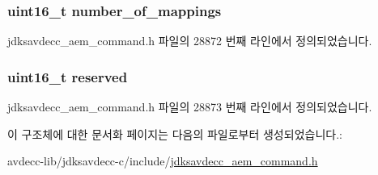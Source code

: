 \subsubsection[{\texorpdfstring{number\+\_\+of\+\_\+mappings}{number_of_mappings}}]{\setlength{\rightskip}{0pt plus 5cm}uint16\+\_\+t number\+\_\+of\+\_\+mappings}\hypertarget{structjdksavdecc__aem__command__remove__audio__mappings_ac7db472c5622ef473d5d0a5c416d5531}{}\label{structjdksavdecc__aem__command__remove__audio__mappings_ac7db472c5622ef473d5d0a5c416d5531}


jdksavdecc\+\_\+aem\+\_\+command.\+h 파일의 28872 번째 라인에서 정의되었습니다.

\subsubsection[{\texorpdfstring{reserved}{reserved}}]{\setlength{\rightskip}{0pt plus 5cm}uint16\+\_\+t reserved}\hypertarget{structjdksavdecc__aem__command__remove__audio__mappings_a5a6ed8c04a3db86066924b1a1bf4dad3}{}\label{structjdksavdecc__aem__command__remove__audio__mappings_a5a6ed8c04a3db86066924b1a1bf4dad3}


jdksavdecc\+\_\+aem\+\_\+command.\+h 파일의 28873 번째 라인에서 정의되었습니다.



이 구조체에 대한 문서화 페이지는 다음의 파일로부터 생성되었습니다.\+:\begin{DoxyCompactItemize}
\item 
avdecc-\/lib/jdksavdecc-\/c/include/\hyperlink{jdksavdecc__aem__command_8h}{jdksavdecc\+\_\+aem\+\_\+command.\+h}\end{DoxyCompactItemize}
